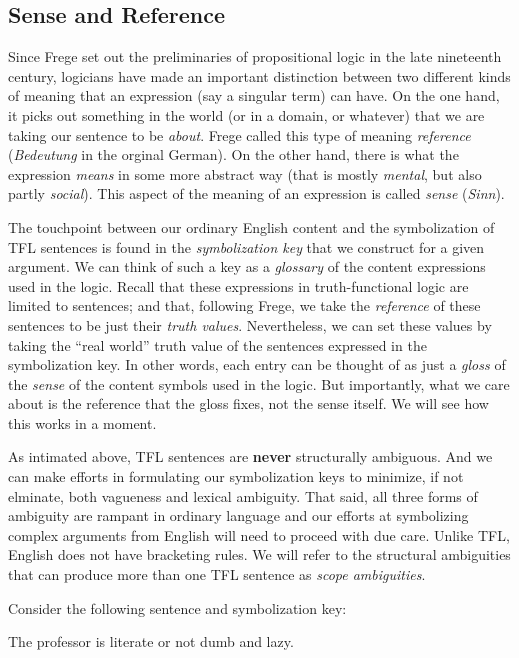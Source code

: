\subsection{Sense and Reference}

Since Frege set out the preliminaries of propositional logic
in the late nineteenth century, logicians have made an important distinction
between two different kinds of meaning that an expression (say a singular term)
can have. On the one hand, it picks out something in the world (or in a domain,
or whatever) that we are taking our sentence to be \emph{about}. Frege called
this type of meaning \emph{reference} (\emph{Bedeutung} in the orginal German).
On the other hand, there is what the expression \emph{means} in some more
abstract way (that is mostly \emph{mental}, but also partly \emph{social}).
This aspect of the meaning of an expression is called \emph{sense}
(\emph{Sinn}).

The touchpoint between our ordinary English content and the symbolization of
TFL sentences is found in the \emph{symbolization key} that we construct for
a given argument. We can think of such a key as a \emph{glossary} of the
content expressions used in the logic. Recall that these expressions in
truth-functional logic are limited to sentences; and that, following Frege, we
take the \emph{reference} of these sentences to be just their \emph{truth
values}. Nevertheless, we can set these values by taking the ``real world''
truth value of the sentences expressed in the symbolization key. In other words,
each entry can be thought of as just a \emph{gloss} of the \emph{sense} of the
content symbols used in the logic. But importantly, what we care about is the
reference that the gloss fixes, not the sense itself. We will see how this works
in a moment.

As intimated above, TFL sentences are \textbf{never} structurally ambiguous.
And we can make efforts in formulating our symbolization keys to minimize, if
not elminate, both vagueness and lexical ambiguity. That said, all three forms
of ambiguity are rampant in ordinary language and our efforts at symbolizing
complex arguments from English will need to proceed with due care. Unlike TFL,
English does not have bracketing rules. We will refer to the structural
ambiguities that can produce more than one TFL sentence as \emph{scope
ambiguities}.

Consider the following sentence and symbolization key:

\begin{argument}
\item[\textbf{(P)}] The professor is literate or not dumb and lazy.
\end{argument}

